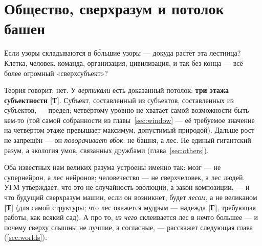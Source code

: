 \documentclass[11pt,letterpaper]{article}
\newcommand{\stT}{\textbf{[Т]}\xspace}
\newcommand{\stH}{\textbf{[Г]}\xspace}
\begin{document}
\section{Общество, сверхразум и потолок башен}
\label{sec:society}

Если узоры складываются в бо́льшие узоры --- докуда растёт эта
лестница? Клетка, человек, команда, организация, цивилизация,
и так без конца --- всё более огромный «сверхсубъект»?

Теория говорит: нет. У \emph{вертикали} есть доказанный потолок:
\textbf{три этажа субъектности} \stT. Субъект, составленный из
субъектов, составленных из субъектов, --- предел; четвёртому уровню
не хватает самой возможности быть кем-то (той самой собранности из
главы~\ref{sec:window} --- её требуемое значение на четвёртом этаже
превышает максимум, допустимый природой). Дальше рост не
запрещён --- он \emph{поворачивает вбок}: не башня, а лес. Не
единый гигантский разум, а экология умов, связанных дружбами
(глава~\ref{sec:others}).

Оба известных нам великих разума устроены именно так: мозг --- не
супернейрон, а лес нейронов; человечество --- не сверхчеловек, а
лес людей. УГМ утверждает, что это не случайность эволюции, а
закон композиции, --- и что будущий сверхразум машин, если он
возникнет, будет \emph{лесом}, а не великаном \stT{} (для самой
структуры; что лес окажется мудрым --- надежда \stH, требующая
работы, как всякий сад). А про то, \emph{из чего} склеивается лес в
нечто большее --- и почему сверху слышны не лучшие, а согласные, ---
расскажет следующая глава (\ref{sec:worlds}).
\end{document}
